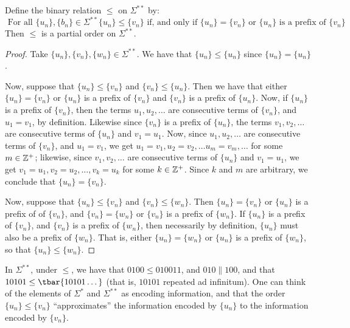 \begin{proposition}\label{proposition_1.2.2}
  Define the binary relation $\leq$ on  $\Sigma^{\ast\ast}$ by:
  \begin{equation*}
    \text{ For all } \{u_n\}, \{b_n\} \in \Sigma^{\ast\ast}
    \{u_n\} \leq \{v_n\} \text{ if, and only if } \{u_n\}=\{v_n\}
    \text{ or } \{u_n\} \text{ is a prefix of } \{v_n\}
  \end{equation*}
  Then $\leq$ is a partial order on  $\Sigma^{\ast\ast}$.
\end{proposition}
\begin{proof}
  Take $\{u_n\}, \{v_n\}, \{w_n\} \in \Sigma^{\ast\ast}$. We have that
  $\{u_n\} \leq \{u_n\}$ since $\{u_n\}=\{u_n\}$.

  Now, suppose that $\{u_n\} \leq \{v_n\}$ and $\{v_n\} \leq \{u_n\}$.
  Then we have that either $\{u_n\}=\{v_n\}$ or $\{u_n\}$ is a prefix
  of $\{v_n\}$ and $\{v_n\}$ is a prefix of $\{u_n\}$. Now, if
  $\{u_n\}$ is a prefix of $\{v_n\}$, then the terms $u_1, u_2, \dots$
  are consecutive terms of $\{v_n\}$, and $u_1=v_1$, by definition.
  Likewise since $\{v_n\}$ is a prefix of $\{u_n\}$, the terms $v_1,
  v_2, \dots$ are consecutive terms of $\{u_n\}$ and $v_1=u_1$. Now,
  since $u_1, u_2, \dots$ are consecutive terms of $\{v_n\}$, and
  $u_1=v_1$, we get $u_1=v_1, u_2=v_2, \dots u_m=v_m, \dots$ for some
  $m \in \mathbb{Z}^+$; likewise, since $v_1, v_2, \dots$ are consecutive
  terms of $\{u_n\}$ and $v_1=u_1$, we get $v_1=u_1, v_2=u_2, \dots,
  v_k=u_k$ for some $k \in \mathbb{Z}^+$. Since $k$ and $m$ are arbitrary, we
  conclude that $\{u_n\}=\{v_n\}$.

  Now, suppose that $\{u_n\} \leq \{v_n\}$ and $\{v_n\} \leq \{w_n\}$.
  Then $\{u_n\}=\{v_n\}$ or $\{u_n\}$ is a prefix of of $\{v_n\}$, and
  $\{v_n\}=\{w_n\}$ or $\{v_n\}$ is a prefix of $\{w_n\}$. If
  $\{u_n\}$ is a prefix of $\{v_n\}$, and $\{v_n\}$ is a prefix of
  $\{w_n\}$, then necessarily by definition, $\{u_n\}$ must also be a
  prefix of $\{w_n\}$. That is, either $\{u_n\}=\{w_n\}$ or $\{u_n\}$
  is a prefix of $\{w_n\}$, so that $\{u_n\} \leq \{w_n\}$.
\end{proof}

\begin{example}\label{example_1.4}
  In $\Sigma^{\ast\ast}$, under $\leq$, we have that  $0100 \leq
  010011$, and $010 \| 100$, and that  $10101 \leq \tbar{10101\dots}$
  (that is, $10101$ repeated ad infinitum). One can think of the
  elements of $\Sigma^{\ast}$ and $\Sigma^{\ast\ast}$ as encoding
  information, and that the order $\{u_n\} \leq \{v_n\}$
  ``approximates'' the information encoded by $\{u_n\}$ to the
  information encoded by $\{v_n\}$.
\end{example}

